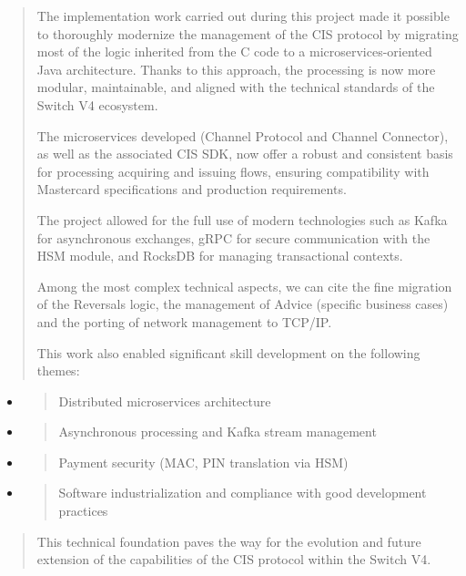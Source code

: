 \documentclass[12pt,a4paper]{report}
\begin{document}
\begin{quote}
The implementation work carried out during this project made it possible
to thoroughly modernize the management of the CIS protocol by migrating
most of the logic inherited from the C code to a microservices-oriented
Java architecture. Thanks to this approach, the processing is now more
modular, maintainable, and aligned with the technical standards of the
Switch V4 ecosystem.

The microservices developed (Channel Protocol and Channel Connector), as
well as the associated CIS SDK, now offer a robust and consistent basis
for processing acquiring and issuing flows, ensuring compatibility with
Mastercard specifications and production requirements.

The project allowed for the full use of modern technologies such as
Kafka for asynchronous exchanges, gRPC for secure communication with the
HSM module, and RocksDB for managing transactional contexts.

Among the most complex technical aspects, we can cite the fine migration
of the Reversals logic, the management of Advice (specific business
cases) and the porting of network management to TCP/IP.

This work also enabled significant skill development on the following
themes:
\end{quote}

\begin{itemize}
\item
  \begin{quote}
  Distributed microservices architecture
  \end{quote}
\item
  \begin{quote}
  Asynchronous processing and Kafka stream management
  \end{quote}
\item
  \begin{quote}
  Payment security (MAC, PIN translation via HSM)
  \end{quote}
\item
  \begin{quote}
  Software industrialization and compliance with good development
  practices
  \end{quote}
\end{itemize}

\begin{quote}
This technical foundation paves the way for the evolution and future
extension of the capabilities of the CIS protocol within the Switch V4.
\end{quote}
\end{document}
